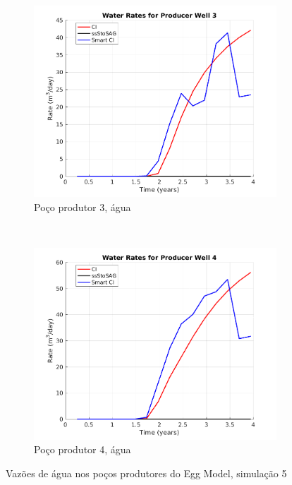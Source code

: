 \begin{figure}[!ht]
	\begin{subfigure}[b]{.45\textwidth}
		\includegraphics[width=\textwidth]{figs/resultadosEgg/imgsim5/EGG_WaterWell3_Zoom}
		\caption{Po\c{c}o produtor 3, \'{a}gua}
		\label{EGG5_WaterWell3}
	\end{subfigure}
	~
	\begin{subfigure}[b]{.45\textwidth}
		\includegraphics[width=\textwidth]{figs/resultadosEgg/imgsim5/EGG_WaterWell4_Zoom}
		\caption{Po\c{c}o produtor 4, \'{a}gua}
		\label{EGG5_WaterWell4}
	\end{subfigure}
	\caption{Vaz\~{o}es de \'{a}gua nos po\c{c}os produtores do Egg Model, simula\c{c}\~{a}o 5}
	\label{EGG5_WaterRates}
\end{figure}